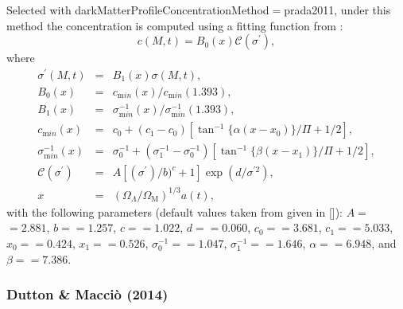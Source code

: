 Selected with {\normalfont \ttfamily darkMatterProfileConcentrationMethod}$=${\normalfont \ttfamily prada2011}, under this method the concentration is computed using a fitting function from \cite{prada_halo_2011}:
\begin{equation}
c(M,t) = B_0(x) \mathcal{C}(\sigma^\prime),
\end{equation}
where
\begin{eqnarray}
\sigma^\prime(M,t) &=& B_1(x) \sigma(M,t), \\
B_0(x) &=& c_{\mathrm min}(x)/c_{\mathrm min}(1.393), \\
B_1(x) &=& \sigma^{-1}_{\mathrm min}(x)/\sigma^{-1}_{\mathrm min}(1.393), \\
c_{\mathrm min}(x) &=& c_0 + (c_1-c_0) [\tan^{-1}\{\alpha (x-x_0)\}/\Pi+1/2], \\
\sigma^{-1}_{\mathrm min}(x) &=& \sigma^{-1}_0 + (\sigma^{-1}_1-\sigma^{-1}_0) [\tan^{-1}\{\beta(x-x_1)\}/\Pi+1/2], \\
\mathcal{C}(\sigma^\prime) &=& A [(\sigma^\prime)/b)^c+1] \exp(d/\sigma^{\prime 2}), \\
x &=& (\Omega_\Lambda/\Omega_{\mathrm M})^{1/3} a(t),
\end{eqnarray}
with the following parameters (default values taken from \cite{prada_halo_2011} given in []): $A=${\normalfont {}}$=2.881$, $b=${\normalfont {}}$=1.257$, $c=${\normalfont {}}$=1.022$, $d=${\normalfont {}}$=0.060$, $c_0=${\normalfont {}}$=3.681$, $c_1=${\normalfont {}}$=5.033$, $x_0=${\normalfont {}}$=0.424$, $x_1=${\normalfont {}}$=0.526$, $\sigma^{-1}_0=${\normalfont {}}$=1.047$, $\sigma^{-1}_1=${\normalfont {}}$=1.646$, $\alpha=${\normalfont {}}$=6.948$, and $\beta=${\normalfont {}}$=7.386$.

\subsubsection{Dutton \& Macci\`o (2014)}\label{phys:darkMatterProfileConcentration:darkMatterProfileConcentrationDuttonMaccio2014}

